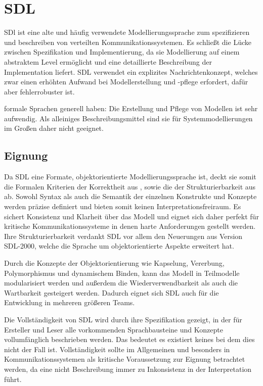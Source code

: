 \section{SDL}
\label{sc:SDLB}
\ac{SDl} ist eine alte und häufig verwendete Modellierungssprache zum spezifizieren und beschreiben von verteilten Kommunikationssystemen. 
Es schließt die Lücke zwischen Spezifikation und Implementierung, da sie Modellierung auf einem abstraktem Level ermöglicht und eine detaillierte Beschreibung der Implementation liefert. \ac{SDL} verwendet ein  explizites  Nachrichtenkonzept,  welches  zwar  einen  erhöhten  Aufwand  bei  Modellerstellung und -pflege erfordert, dafür aber fehlerrobuster ist. 


formale Sprachen generell haben: Die Erstellung und Pflege von Modellen ist sehr aufwendig. Als alleiniges Beschreibungsmittel sind sie für Systemmodellierungen im Großen daher nicht geeignet.
\subsection{Eignung}
\label{scc:SDL_Eignung}
Da \ac{SDL} eine Formate, objektorientierte Modellierungssprache ist, deckt sie somit die Formalen Kriterien der Korrektheit aus \pageref{scc:Korrektheit}, sowie die der Strukturierbarkeit aus \pageref{scc:Strukturierbarkeit} ab. Sowohl Syntax als auch die Semantik der einzelnen Konstrukte und Konzepte werden präzise definiert und bieten somit keinen Interpretationsfreiraum. Es sichert Konsistenz und Klarheit über das Modell und eignet sich daher perfekt für kritische Kommunikationssysteme in denen harte Anforderungen gestellt werden. Ihre Strukturierbarkeit verdankt \ac{SDL} vor allem den Neuerungen aus Version \ac{SDL}-2000, welche die Sprache um objektorientierte Aspekte erweitert hat.

Durch die Konzepte der Objektorientierung wie Kapselung, Vererbung, Polymorphismus und dynamischem Binden, kann das Modell in Teilmodelle modularisiert werden und außerdem die Wiederverwendbarkeit als auch die Wartbarkeit gesteigert werden. Dadurch eignet sich \ac{SDL} auch für die Entwicklung in mehreren größeren Teams. 

Die Vollständigkeit von \ac{SDL} wird durch ihre Spezifikation gezeigt, in der für Ersteller und Leser alle vorkommenden Sprachbausteine und Konzepte vollumfänglich beschrieben werden. Das bedeutet es existiert keines bei dem dies nicht der Fall ist. Vollständigkeit sollte im Allgemeinen und besonders in Kommunikationssystemen als kritische Voraussetzung zur Eignung betrachtet werden, da eine nicht Beschreibung immer zu Inkonsistenz in der Interpretation führt.

